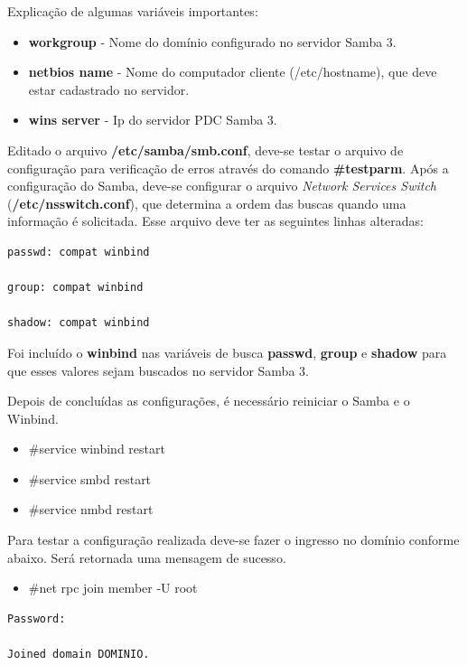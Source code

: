 Explicação de algumas variáveis importantes:
\begin{itemize}
	\item \textbf{workgroup} - Nome do domínio configurado no servidor Samba 3.
	\item \textbf{netbios name} - Nome do computador cliente (/etc/hostname), que deve estar cadastrado no servidor.
	\item \textbf{wins server} - Ip do servidor PDC Samba 3.
\end{itemize}

Editado o arquivo \textbf{/etc/samba/smb.conf}, deve-se testar o arquivo de configuração para verificação de erros através do comando \textbf{\#testparm}.
Após a configuração do Samba, deve-se configurar o arquivo \textit{Network Services Switch} (\textbf{/etc/nsswitch.conf}), que determina a ordem das buscas quando uma informação é solicitada. Esse arquivo deve ter as seguintes linhas alteradas:\\

\begin{lstlisting}	
passwd: compat winbind

group: compat winbind

shadow: compat winbind	
\end{lstlisting}

Foi incluído o \textbf{winbind} nas variáveis de busca \textbf{passwd}, \textbf{group} e \textbf{shadow} para que esses valores sejam buscados no servidor Samba 3.

Depois de concluídas as configurações, é necessário reiniciar o Samba e o Winbind.

\begin{itemize}
	\item \#service winbind restart
	\item \#service smbd restart
	\item \#service nmbd restart	
\end{itemize}


Para testar a configuração realizada deve-se fazer o ingresso no domínio conforme abaixo. Será retornada uma mensagem de sucesso.\\

\begin{itemize}
	\item \#net rpc join member -U root
\end{itemize}

\begin{lstlisting}	
Password:

Joined domain DOMINIO.
\end{lstlisting}

